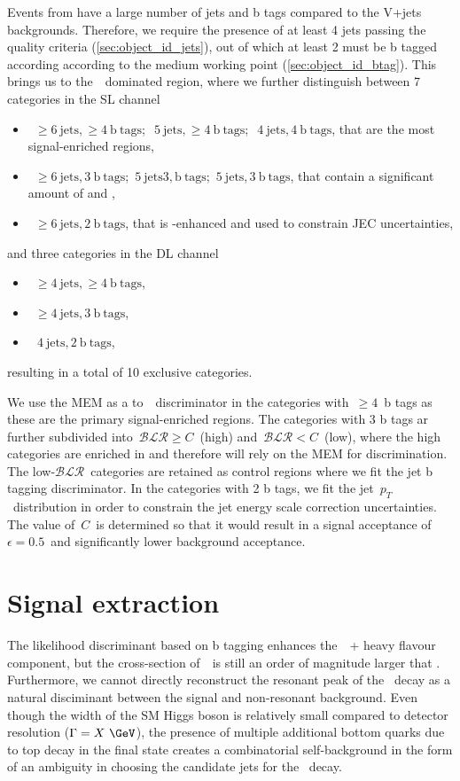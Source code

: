 Events from \ttHbb have a large number of jets and b tags compared to the V+jets backgrounds. Therefore, we require the presence of at least 4 jets passing the quality criteria (\cref{sec:object_id_jets}), out of which at least 2 must be b tagged according according to the medium working point (\cref{sec:object_id_btag}). This brings us to the~\ttbar~dominated region, where we further distinguish between 7 categories in the SL channel
\begin{itemize}
\item~$\ge 6~\mathrm{jets},\ge 4~\mathrm{b~tags}$;~$~5~\mathrm{jets},\ge 4~\mathrm{b~tags}$;~$~4~\mathrm{jets},4~\mathrm{b~tags}$, that are the most signal-enriched regions,
\item~$\ge 6~\mathrm{jets},3~\mathrm{b~tags}$;~$5~\mathrm{jets} 3,\mathrm{b~tags}$;~$5~\mathrm{jets},3~\mathrm{b~tags}$, that contain a significant amount of \ttcc and \ttbb,
\item~$\ge 6~\mathrm{jets},2~\mathrm{b~tags}$, that is \ttlf-enhanced and used to constrain JEC uncertainties,
\end{itemize}
and three categories in the DL channel
\begin{itemize}
\item~$\ge 4~\mathrm{jets},\ge 4~\mathrm{b~tags}$,
\item~$\ge 4~\mathrm{jets},3~\mathrm{b~tags}$,
\item~$~4~\mathrm{jets},2~\mathrm{b~tags}$,
\end{itemize}
resulting in a total of 10 exclusive categories.

We use the MEM as a \ttHbb to~\ttbb~discriminator in the categories with~$\ge 4$~b tags as these are the primary signal-enriched regions. The categories with 3 b tags ar further subdivided into~$\mathcal{BLR} \ge C$~(high) and~$\mathcal{BLR} < C$~(low), where the high categories are enriched in \ttHbb and therefore will rely on the MEM for discrimination. The low-$\mathcal{BLR}$~categories are retained as control regions where we fit the jet b tagging discriminator. In the categories with 2 b tags, we fit the jet~$p_T$~distribution in order to constrain the jet energy scale correction uncertainties. The value of~$C$~is determined so that it would result in a signal acceptance of~$\epsilon = 0.5$~and significantly lower background acceptance.

\section{Signal extraction}
\label{sec:mem_application}
The likelihood discriminant based on b tagging enhances the~\ttbar~+ heavy flavour component, but the cross-section of~\ttbb~is still an order of magnitude larger that \ttHbb. Furthermore, we cannot directly reconstruct the resonant peak of the \Hbb~decay as a natural disciminant between the signal and non-resonant background. Even though the width of the SM Higgs boson is relatively small compared to detector resolution ($\Gamma = X~\GeV$), the presence of multiple additional bottom quarks due to top decay in the final state creates a combinatorial self-background in the form of an ambiguity in choosing the candidate jets for the \Hbb~decay.

